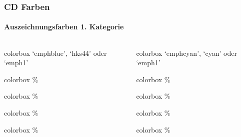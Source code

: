 \documentclass[german,notoc,draft]{tudbeamer}%
\begin{document}
\begin{frame}
	\frametitle{CD Farben}
	\framesubtitle{Auszeichnungsfarben 1. Kategorie}

	\begin{columns}[T]
		\begin{column}{.4\textwidth}%
			\begin{beamercolorbox}[wd=0.9\textwidth,sep=1em]{colorbox}
				\centering `emphblue', `hks44' oder `emph1'
		    \end{beamercolorbox}
			\begin{beamercolorbox}[wd=0.9\textwidth,sep=1em]{colorbox}
				\%
		    \end{beamercolorbox}
			\begin{beamercolorbox}[wd=0.9\textwidth,sep=1em]{colorbox}
				\%
		    \end{beamercolorbox}
			\begin{beamercolorbox}[wd=0.9\textwidth,sep=1em]{colorbox}
				\%
		    \end{beamercolorbox}
			\begin{beamercolorbox}[wd=0.9\textwidth,sep=1em]{colorbox}
				\%
		    \end{beamercolorbox}
		\end{column}

		\begin{column}{.4\textwidth}%
			\begin{beamercolorbox}[wd=0.9\textwidth,sep=1em]{colorbox}
				\centering `emphcyan', `cyan' oder `emph1'
		    \end{beamercolorbox}
			\begin{beamercolorbox}[wd=0.9\textwidth,sep=1em]{colorbox}
				\%
		    \end{beamercolorbox}
			\begin{beamercolorbox}[wd=0.9\textwidth,sep=1em]{colorbox}
				\%
		    \end{beamercolorbox}
			\begin{beamercolorbox}[wd=0.9\textwidth,sep=1em]{colorbox}
				\%
		    \end{beamercolorbox}
			\begin{beamercolorbox}[wd=0.9\textwidth,sep=1em]{colorbox}
				\%
		    \end{beamercolorbox}
		\end{column}
	\end{columns}
\end{frame}
\end{document}

